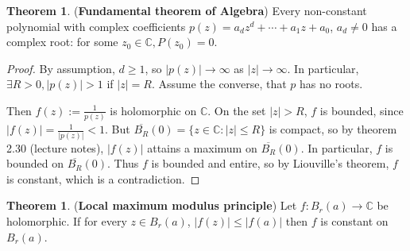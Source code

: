 \documentclass[12pt,a4paper]{article}
\theoremstyle{definition}
\newtheorem{theorem}[definition]{Theorem}
\begin{document}
\begin{theorem}
	(\textbf{Fundamental theorem of Algebra}) Every non-constant polynomial with complex coefficients $p(z) = a_d z^d + \cdots + a_1 z + a_0$, $a_d \ne 0$ has a complex root: for some $z_0 \in \mathbb{C}, P(z_0) = 0$.
\end{theorem}

\begin{proof}
	By assumption, $d \ge 1$, so $|p(z)| \rightarrow \infty$ as $|z| \rightarrow \infty$. In particular, $\exists R > 0, |p(z)| > 1$ if $|z| = R$. Assume the converse, that $p$ has no roots.

	Then $f(z) := \frac{1}{p(z)}$ is holomorphic on $\mathbb{C}$. On the set $|z| > R$, $f$ is bounded, since $|f(z)| = \frac{1}{|p(z)|} < 1$. But $\overline{B_R}(0) = \{ z \in \mathbb{C}: |z| \le R \}$ is compact, so by theorem 2.30 (lecture notes), $|f(z)|$ attains a maximum on $\overline{B_R}(0)$. In particular, $f$ is bounded on $\overline{B_R}(0)$. Thus $f$ is bounded and entire, so by Liouville's theorem, $f$ is constant, which is a contradiction.
\end{proof}

\begin{theorem}
	(\textbf{Local maximum modulus principle}) Let $f: B_r(a) \rightarrow \mathbb{C}$ be holomorphic. If for every $z \in B_r(a)$, $|f(z)| \le |f(a)|$ then $f$ is constant on $B_r(a)$.
\end{theorem}
\end{document}
